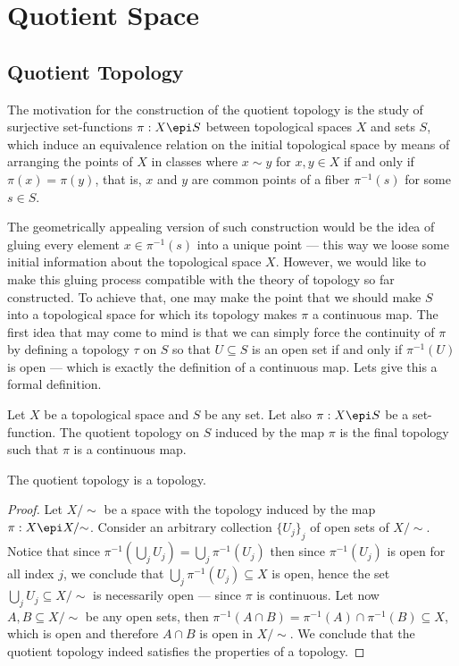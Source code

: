 \section{Quotient Space}

\subsection{Quotient Topology}

The motivation for the construction of the quotient topology is the study of
surjective set-functions \(\pi: X \epi S\) between topological spaces \(X\) and
sets \(S\), which induce an equivalence relation on the initial topological
space by means of arranging the points of \(X\) in classes where \(x \sim y\)
for \(x, y \in X\) if and only if \(\pi(x) = \pi(y)\), that is, \(x\) and \(y\)
are common points of a fiber \(\pi^{-1}(s)\) for some \(s \in S\).

The geometrically appealing version of such construction would be the idea of
gluing every element \(x \in \pi^{-1}(s)\) into a unique point --- this way we
loose some initial information about the topological space \(X\). However, we
would like to make this gluing process compatible with the theory of topology so
far constructed. To achieve that, one may make the point that we should make
\(S\) into a topological space for which its topology makes \(\pi\) a continuous
map. The first idea that may come to mind is that we can simply force the
continuity of \(\pi\) by defining a topology \(\tau\) on \(S\) so that
\(U \subseteq S\) is an open set if and only if \(\pi^{-1}(U)\) is open ---
which is exactly the definition of a continuous map. Lets give this a formal
definition.

\begin{definition}\label{def:quotient-topology}
Let \(X\) be a topological space and \(S\) be any set. Let also \(\pi: X \epi S\)
be a set-function. The quotient topology on \(S\) induced by the map \(\pi\) is
the final topology such that \(\pi\) is a continuous map.
\end{definition}

\begin{proposition}
The quotient topology is a topology.
\end{proposition}

\begin{proof}
Let \(X /{\sim}\) be a space with the topology induced by the map
\(\pi: X \epi X /{\sim}\). Consider an arbitrary collection \({\{U_{j}\}}_j\) of
open sets of \(X /{\sim}\). Notice that since
\(\pi^{-1}(\bigcup_{j} U_{j}) = \bigcup_j \pi^{-1}(U_j)\) then since
\(\pi^{-1}(U_j)\) is open for all index \(j\), we conclude that
\(\bigcup_j \pi^{-1}(U_{j}) \subseteq X\) is open, hence the set
\(\bigcup_j U_j \subseteq X /{\sim}\) is necessarily open --- since \(\pi\) is
continuous. Let now \(A, B \subseteq X /{\sim}\) be any open sets, then
\(\pi^{-1}(A \cap B) = \pi^{-1}(A) \cap \pi^{-1}(B) \subseteq X\), which is open
and therefore \(A \cap B\) is open in \(X /{\sim}\). We conclude that the
quotient topology indeed satisfies the properties of a topology.
\end{proof}

